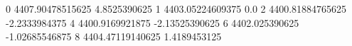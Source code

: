 0 4407.90478515625 4.8525390625
1 4403.05224609375 0.0
2 4400.81884765625 -2.2333984375
4 4400.9169921875 -2.13525390625
6 4402.025390625 -1.02685546875
8 4404.47119140625 1.4189453125
